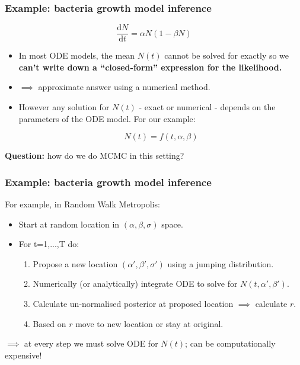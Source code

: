 \documentclass[handout]{beamer}
\begin{document}
\begin{frame}
	\frametitle{Example: bacteria growth model inference}
	
	\begin{equation}
	\frac{\mathrm{d}N}{\mathrm{d}t} = \alpha N (1-\beta N)
	\end{equation}
	
	\begin{itemize}
		\item<2-> In most ODE models, the mean $N(t)$ cannot be solved for exactly so we \textbf{can't write down a ``closed-form'' expression for the likelihood.}
		\item<3-> $\implies$ approximate answer using a numerical method.
		\item<4-> However any solution for $N(t)$ - exact or numerical - depends on the parameters of the ODE model. For our example:
		
		
		\begin{equation}
		N(t) = f(t,\alpha,\beta)
		\end{equation}
		
	\end{itemize}
	
	\vspace{0.2cm}
	
	\textbf{Question:} how do we do MCMC in this setting?
	
\end{frame}

\begin{frame}
	\frametitle{Example: bacteria growth model inference}
	
	 For example, in Random Walk Metropolis:
	
	\begin{itemize}
		\item<3-> Start at random location in $(\alpha,\beta,\sigma)$ space.
		\item<4-> For t=1,...,T do:
		\begin{enumerate}
			\item<5-> Propose a new location $(\alpha',\beta',\sigma')$ using a jumping distribution.
			\item<6-> Numerically (or analytically) integrate ODE to solve for $N(t,\alpha',\beta')$.
			\item<7-> Calculate un-normalised posterior at proposed location $\implies$ calculate $r$.
			\item<8-> Based on $r$ move to new location or stay at original.
		\end{enumerate}
	\end{itemize}
	
	$\implies$ at every step we must solve ODE for $N(t)$; can be computationally expensive!
	
\end{frame}
\end{document}
